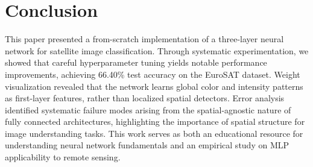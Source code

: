 \documentclass[sigconf,nonacm]{acmart}
\begin{document}
\section{Conclusion}

This paper presented a from-scratch implementation of a three-layer neural network for satellite image classification. Through systematic experimentation, we showed that careful hyperparameter tuning yields notable performance improvements, achieving 66.40\% test accuracy on the EuroSAT dataset. Weight visualization revealed that the network learns global color and intensity patterns as first-layer features, rather than localized spatial detectors. Error analysis identified systematic failure modes arising from the spatial-agnostic nature of fully connected architectures, highlighting the importance of spatial structure for image understanding tasks. This work serves as both an educational resource for understanding neural network fundamentals and an empirical study on MLP applicability to remote sensing.
\end{document}
